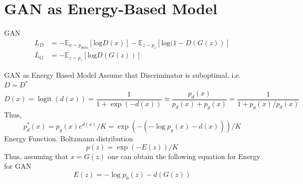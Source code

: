 \documentclass[xcolor=dvipsnames]{beamer}
\begin{document}
    \begin{frame}
        \titlepage
    \end{frame}
    \section{GAN as Energy-Based Model} 
    \begin{frame}{GAN}
        \begin{align*}
            L_D &= -\mathbb{E}_{x \sim p_{data}} [ \text{log} D(x)] - \mathbb{E}_{z \sim p_z} [\text{log}(1 - D(G(z))] \\    
            L_G &= -\mathbb{E}_{z \sim p_z} [\text{log} D(G(z))]
        \end{align*}
    \end{frame}

    \begin{frame}{GAN as Energy Based Model}
        Assume that Discriminator is suboptimal, i.e. $D = D^*$
        \begin{equation*}
            D(x) = \operatorname*{logit}(d(x)) = \frac{1}{1 + \exp(-d(x))} \approx \frac{p_d(x)}{p_d(x) + p_g(x)}  = \frac{1}{1 + p_g(x)/p_d(x)}
        \end{equation*}
        Thus,
        \begin{equation*}
                p_d^*(x) = p_g(x) e^{d(x)} / K = \exp\left( - (-\log p_g(x) - d(x))\right) / K
        \end{equation*}
        Energy Function. Boltzmann distribution
        \begin{equation*}
            p(z) = \exp(-E(z)) / K 
        \end{equation*}
        Thus, assuming that $x = G(z)$ one can obtain the following equation for Energy for GAN
        \begin{equation*}
            E(z) = -\log p_0(z) - d(G(z))
        \end{equation*}
    \end{frame}
\end{document}
